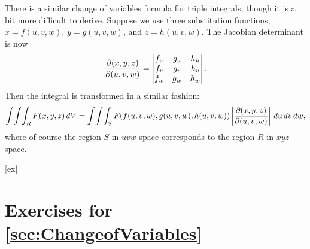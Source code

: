 There is a similar change of variables formula for triple integrals,
though it is a bit more difficult to derive.
Suppose we use three substitution functions, $x=f(u,v,w)$,
$y=g(u,v,w)$, and $z=h(u,v,w)$.  The Jacobian determinant is now
\[
  {\partial(x,y,z)\over\partial(u,v,w)} =  
  \left|\begin{matrix}	f_u	&	g_u	&	h_u	\\
  						f_v	&	g_v	&	h_v	\\
  						f_w	&	g_w	&	h_w
  		\end{matrix}\right|.
\]
Then the integral is transformed in a similar fashion:
\[
  \int\!\int\!\int_R F(x,y,z) \, dV = 
  \int\!\int\!\int_S F(f(u,v,w),g(u,v,w),h(u,v,w)) 
  \left|{\partial(x,y,z)\over\partial(u,v,w)}\right| \,du\,dv\,dw,
\]
where of course the region $S$ in $uvw$ space corresponds to the
region $R$ in $xyz$ space.


[ex]
\section*{Exercises for \ref{sec:ChangeofVariables}}

